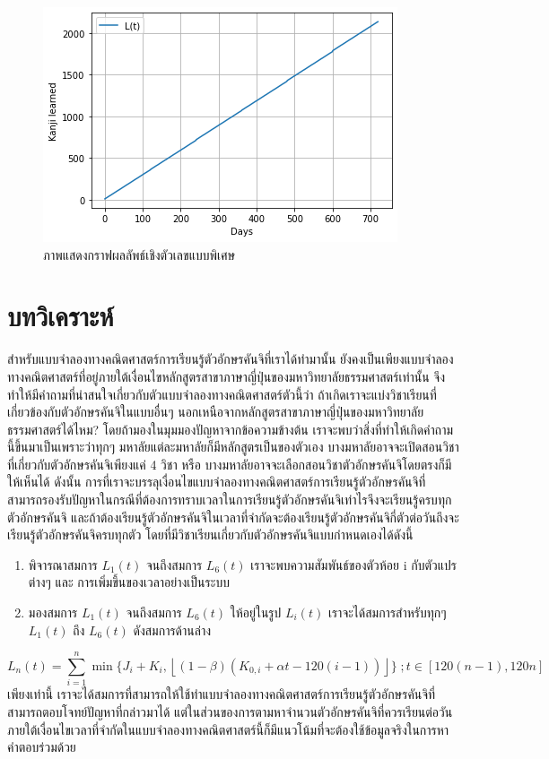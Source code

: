\documentclass{article}
\begin{document}
\begin{figure}
\centering
\includegraphics[scale=0.75]{5.png}
\caption{ภาพแสดงกราฟผลลัพธ์เชิงตัวเลขแบบพิเศษ}
\label{fig:graph4}
\end{figure}

\section{บทวิเคราะห์}
สำหรับแบบจำลองทางคณิตศาสตร์การเรียนรู้ตัวอักษรคันจิที่เราได้ทำมานั้น ยังคงเป็นเพียงแบบจำลองทางคณิตศาสตร์ที่อยู่ภายใต้เงื่อนไขหลักสูตรสาขาภาษาญี่ปุ่นของมหาวิทยาลัยธรรมศาสตร์เท่านั้น จึงทำให้มีคำถามที่น่าสนใจเกี่ยวกับตัวแบบจำลองทางคณิตศาสตร์ตัวนี้ว่า ถ้าเกิดเราจะแบ่งวิชาเรียนที่เกี่ยวข้องกับตัวอักษรคันจิในแบบอื่นๆ นอกเหนือจากหลักสูตรสาขาภาษาญี่ปุ่นของมหาวิทยาลัยธรรมศาสตร์ได้ไหม? โดยถ้ามองในมุมมองปัญหาจากข้อความข้างต้น เราจะพบว่าสิ่งที่ทำให้เกิดคำถามนี้ขึ้นมาเป็นเพราะว่าทุกๆ มหาลัยแต่ละมหาลัยก็มีหลักสูตรเป็นของตัวเอง บางมหาลัยอาจจะเปิดสอนวิชาที่เกี่ยวกับตัวอักษรคันจิเพียงแค่ 4 วิชา หรือ บางมหาลัยอาจจะเลือกสอนวิชาตัวอักษรคันจิโดยตรงก็มีให้เห็นได้ ดังนั้น การที่เราจะบรรลุเงื่อนไขแบบจำลองทางคณิตศาสตร์การเรียนรู้ตัวอักษรคันจิที่สามารถรองรับปัญหาในกรณีที่ต้องการทราบเวลาในการเรียนรู้ตัวอักษรคันจิเท่าไรจึงจะเรียนรู้ครบทุกตัวอักษรคันจิ และถ้าต้องเรียนรู้ตัวอักษรคันจิในเวลาที่จำกัดจะต้องเรียนรู้ตัวอักษรคันจิกี่ตัวต่อวันถึงจะเรียนรู้ตัวอักษรคันจิครบทุกตัว โดยที่มีวิชาเรียนเกี่ยวกับตัวอักษรคันจิแบบกำหนดเองได้ดังนี้ 
\begin{enumerate}
	\item พิจารณาสมการ $L_1(t)$ จนถึงสมการ $L_6(t)$ เราจะพบความสัมพันธ์ของตัวห้อย i กับตัวแปรต่างๆ และ การเพิ่มขึ้นของเวลาอย่างเป็นระบบ 
	\item มองสมการ $L_1(t)$ จนถึงสมการ $L_6(t)$ ให้อยู่ในรูป $L_i(t)$ เราจะได้สมการสำหรับทุกๆ $L_1(t)$ ถึง $L_6(t)$ ดังสมการด้านล่าง
\end{enumerate}
$$ L_n(t) = \sum_{i=1}^{n} \min \{J_i + K_i, \left\lfloor (1 - \beta)(K_{0,i} + \alpha{t - 120(i - 1)}) \right\rfloor\} \; ; t \in [120(n - 1),120n] $$ 
เพียงเท่านี้ เราจะได้สมการที่สามารถให้ใช้ทำแบบจำลองทางคณิตศาสตร์การเรียนรู้ตัวอักษรคันจิที่สามารถตอบโจทย์ปัญหาที่กล่าวมาได้ แต่ในส่วนของการตามหาจำนวนตัวอักษรคันจิที่ควรเรียนต่อวันภายใต้เงื่อนไขเวลาที่จำกัดในแบบจำลองทางคณิตศาสตร์นี้ก็มีแนวโน้มที่จะต้องใช้ข้อมูลจริงในการหาคำตอบร่วมด้วย
\end{document}
